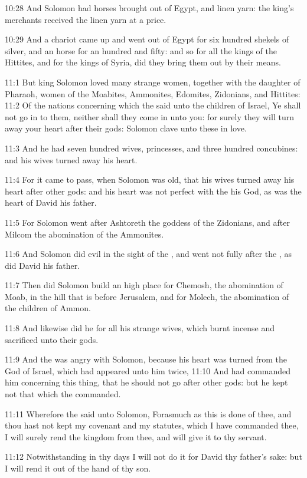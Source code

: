 10:28 And Solomon had horses brought out of Egypt, and linen yarn: the king's merchants received the linen yarn at a price.

10:29 And a chariot came up and went out of Egypt for six hundred shekels of silver, and an horse for an hundred and fifty: and so for all the kings of the Hittites, and for the kings of Syria, did they bring them out by their means.

11:1 But king Solomon loved many strange women, together with the daughter of Pharaoh, women of the Moabites, Ammonites, Edomites, Zidonians, and Hittites: 11:2 Of the nations concerning which the \LORD said unto the children of Israel, Ye shall not go in to them, neither shall they come in unto you: for surely they will turn away your heart after their gods: Solomon clave unto these in love.

11:3 And he had seven hundred wives, princesses, and three hundred concubines: and his wives turned away his heart.

11:4 For it came to pass, when Solomon was old, that his wives turned away his heart after other gods: and his heart was not perfect with the \LORD his God, as was the heart of David his father.

11:5 For Solomon went after Ashtoreth the goddess of the Zidonians, and after Milcom the abomination of the Ammonites.

11:6 And Solomon did evil in the sight of the \LORD, and went not fully after the \LORD, as did David his father.

11:7 Then did Solomon build an high place for Chemosh, the abomination of Moab, in the hill that is before Jerusalem, and for Molech, the abomination of the children of Ammon.

11:8 And likewise did he for all his strange wives, which burnt incense and sacrificed unto their gods.

11:9 And the \LORD was angry with Solomon, because his heart was turned from the \LORD God of Israel, which had appeared unto him twice, 11:10 And had commanded him concerning this thing, that he should not go after other gods: but he kept not that which the \LORD commanded.

11:11 Wherefore the \LORD said unto Solomon, Forasmuch as this is done of thee, and thou hast not kept my covenant and my statutes, which I have commanded thee, I will surely rend the kingdom from thee, and will give it to thy servant.

11:12 Notwithstanding in thy days I will not do it for David thy father's sake: but I will rend it out of the hand of thy son.


